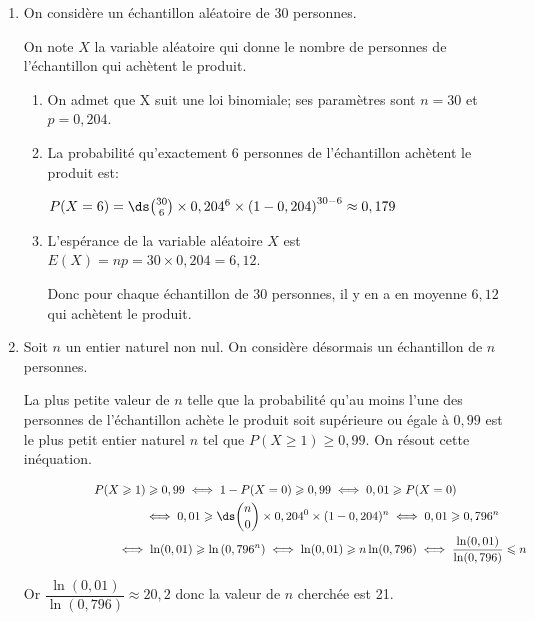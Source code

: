 \begin{enumerate}
\item On considère un échantillon aléatoire de $30$ personnes.

On note $X$ la variable aléatoire qui donne le nombre de personnes de l'échantillon qui achètent le produit.
	\begin{enumerate}
		\item On admet que X suit une loi binomiale; ses paramètres sont $n=30$ et $p=0,204$.
		
		\item La probabilité qu'exactement 6 personnes de l'échantillon achètent le produit est:
		
$P(X=6)= \ds\binom{30}{6}\times 0,204^{6}\times \left (1-0,204\right )^{30-6}
\approx 0,179$
		
		

		\item 
L'espérance de la variable aléatoire $X$ est $E(X)=np = 30\times 0,204 = 6,12$.

Donc pour chaque échantillon de 30 personnes, il y en a en moyenne $6,12$ qui achètent le produit.

	\end{enumerate}
\item Soit $n$ un entier naturel non nul.
On considère désormais un échantillon de $n$ personnes. 

La plus petite valeur de $n$ telle que la probabilité qu'au moins l'une des personnes de l'échantillon achète le produit soit supérieure ou égale à $0,99$ est le plus petit entier naturel $n$ tel que $P(X\geqslant 1) \geqslant 0,99$. On résout cette inéquation.

$\begin{gathered}P(X\geqslant 1) \geqslant 0,99
\iff 1-P(X=0) \geqslant 0,99
\iff 0,01 \geqslant P(X=0)\\
\phantom{P(X\geqslant 1) \geqslant 0,99}
\iff 0,01 \geqslant \ds\binom{n}{0}\times  0,204^0 \times (1-0,204)^n
\iff 0,01\geqslant 0,796^n\\
\phantom{P(X\geqslant 1) \geqslant 0,99}
\iff \ln(0,01) \geqslant \ln\left (0,796^n\right )
\iff \ln(0,01) \geqslant n\ln(0,796)
\iff \dfrac{\ln(0,01)}{\ln(0,796)} \leqslant n\end{gathered}$

Or $\dfrac{\ln(0,01)}{\ln(0,796)}\approx 20,2$ donc la valeur de $n$ cherchée est 21.

\end{enumerate}

\bigskip
